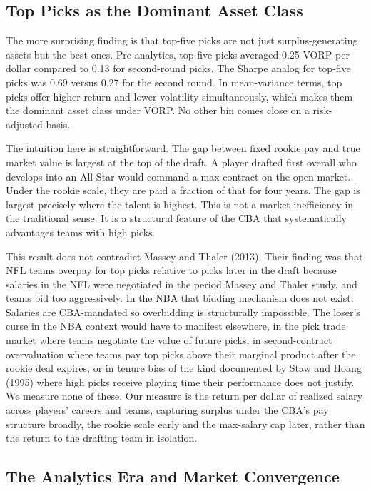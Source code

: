 \documentclass[12pt,letterpaper]{article}
\begin{document}
\subsection{Top Picks as the Dominant Asset Class}

The more surprising finding is that top-five picks are not just surplus-generating assets but the best ones. Pre-analytics, top-five picks averaged 0.25 VORP per dollar compared to 0.13 for second-round picks. The Sharpe analog for top-five picks was 0.69 versus 0.27 for the second round. In mean-variance terms, top picks offer higher return and lower volatility simultaneously, which makes them the dominant asset class under VORP. No other bin comes close on a risk-adjusted basis.

The intuition here is straightforward. The gap between fixed rookie pay and true market value is largest at the top of the draft. A player drafted first overall who develops into an All-Star would command a max contract on the open market. Under the rookie scale, they are paid a fraction of that for four years. The gap is largest precisely where the talent is highest. This is not a market inefficiency in the traditional sense. It is a structural feature of the CBA that systematically advantages teams with high picks.

This result does not contradict Massey and Thaler (2013). Their finding was that NFL teams overpay for top picks relative to picks later in the draft because salaries in the NFL were negotiated in the period Massey and Thaler study, and teams bid too aggressively. In the NBA that bidding mechanism does not exist. Salaries are CBA-mandated so overbidding is structurally impossible. The loser's curse in the NBA context would have to manifest elsewhere, in the pick trade market where teams negotiate the value of future picks, in second-contract overvaluation where teams pay top picks above their marginal product after the rookie deal expires, or in tenure bias of the kind documented by Staw and Hoang (1995) where high picks receive playing time their performance does not justify. We measure none of these. Our measure is the return per dollar of realized salary across players' careers and teams, capturing surplus under the CBA's pay structure broadly, the rookie scale early and the max-salary cap later, rather than the return to the drafting team in isolation.


\subsection{The Analytics Era and Market Convergence}
\end{document}
